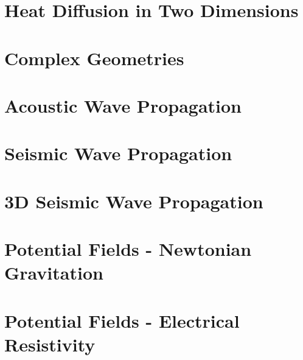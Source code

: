 \documentclass{esysdoc}
\begin{document}
\chapter{Heat Diffusion in Two Dimensions}
 \label{CHAP HEAT 2a}
 
\chapter{Complex Geometries}
 \label{CHAP HEAT 2}
 
 
\chapter{Acoustic Wave Propagation}
% 
\chapter{Seismic Wave Propagation}
 

\chapter{3D Seismic Wave Propagation}
 
 
\chapter{Potential Fields - Newtonian Gravitation}
 
%  
\chapter{Potential Fields - Electrical Resistivity}
 





\appendix
%
\end{document}
